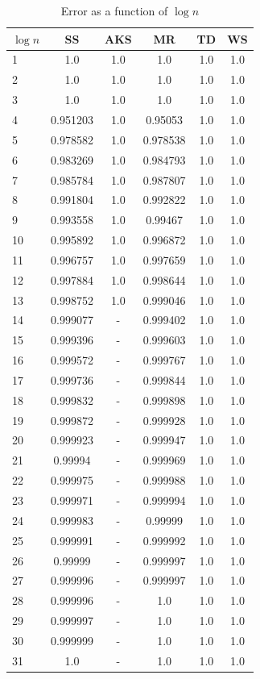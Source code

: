 \begin{table}
    \centering
    \caption{Error as a function of $\log n$}
    \begin{tabular}{|l|c|c|c|c|c|} \hline
        $\log n$ & SS & AKS & MR & TD & WS \\
        \hline
1 & 1.0 & 1.0 & 1.0 & 1.0 & 1.0 \\
2 & 1.0 & 1.0 & 1.0 & 1.0 & 1.0 \\
3 & 1.0 & 1.0 & 1.0 & 1.0 & 1.0 \\
4 & 0.951203 & 1.0 & 0.95053 & 1.0 & 1.0 \\
5 & 0.978582 & 1.0 & 0.978538 & 1.0 & 1.0 \\
6 & 0.983269 & 1.0 & 0.984793 & 1.0 & 1.0 \\
7 & 0.985784 & 1.0 & 0.987807 & 1.0 & 1.0 \\
8 & 0.991804 & 1.0 & 0.992822 & 1.0 & 1.0 \\
9 & 0.993558 & 1.0 & 0.99467 & 1.0 & 1.0 \\
10& 0.995892 & 1.0 & 0.996872 & 1.0 & 1.0 \\
11& 0.996757 & 1.0 & 0.997659 & 1.0 & 1.0 \\
12& 0.997884 & 1.0 & 0.998644 & 1.0 & 1.0 \\
13& 0.998752 & 1.0 & 0.999046 & 1.0 & 1.0 \\
14& 0.999077 & - & 0.999402 & 1.0 & 1.0 \\
15& 0.999396 & - & 0.999603 & 1.0 & 1.0 \\
16& 0.999572 & - & 0.999767 & 1.0 & 1.0 \\
17& 0.999736 & - & 0.999844 & 1.0 & 1.0 \\
18& 0.999832 & - & 0.999898 & 1.0 & 1.0 \\
19& 0.999872 & - & 0.999928 & 1.0 & 1.0 \\
20& 0.999923 & - & 0.999947 & 1.0 & 1.0 \\
21& 0.99994 & - & 0.999969 & 1.0 & 1.0 \\
22& 0.999975 & - & 0.999988 & 1.0 & 1.0 \\
23& 0.999971 & - & 0.999994 & 1.0 & 1.0 \\
24& 0.999983 & - & 0.99999 & 1.0 & 1.0 \\
25& 0.999991 & - & 0.999992 & 1.0 & 1.0 \\
26& 0.99999 & - & 0.999997 & 1.0 & 1.0 \\
27& 0.999996 & - & 0.999997 & 1.0 & 1.0 \\
28& 0.999996 & - & 1.0 & 1.0 & 1.0 \\
29& 0.999997 & - & 1.0 & 1.0 & 1.0 \\
30& 0.999999 & - & 1.0 & 1.0 & 1.0 \\
31& 1.0 & - & 1.0 & 1.0 & 1.0 \\
        \hline
    \end{tabular}
    \label{table:results}
\end{table}

